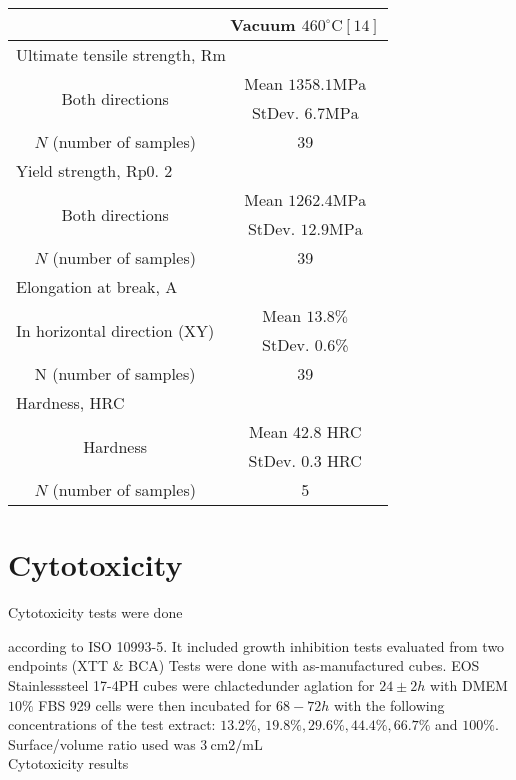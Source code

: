 \documentclass[10pt]{article}
\begin{document}
\begin{center}
\begin{tabular}{|c|c|}
\hline
 & Vacuum $460^{\circ} \mathrm{C}[14]$ \\
\hline
\multicolumn{2}{|l|}{Ultimate tensile strength, Rm} \\
\hline
\multirow[t]{2}{*}{Both directions} & Mean $1358.1 \mathrm{MPa}$ \\
\hline
 & StDev. $6.7 \mathrm{MPa}$ \\
\hline
$N$ (number of samples) & 39 \\
\hline
\multicolumn{2}{|l|}{Yield strength, Rp0. 2} \\
\hline
\multirow[t]{2}{*}{Both directions} & Mean $1262.4 \mathrm{MPa}$ \\
\hline
 & StDev. $12.9 \mathrm{MPa}$ \\
\hline
$N$ (number of samples) & 39 \\
\hline
\multicolumn{2}{|l|}{Elongation at break, A} \\
\hline
\multirow[t]{2}{*}{In horizontal direction (XY)} & Mean $13.8 \%$ \\
\hline
 & StDev. 0.6\% \\
\hline
$\mathrm{N}$ (number of samples) & 39 \\
\hline
\multicolumn{2}{|l|}{Hardness, HRC} \\
\hline
\multirow[t]{2}{*}{Hardness} & Mean 42.8 HRC \\
\hline
 & StDev. 0.3 HRC \\
\hline
$N$ (number of samples) & 5 \\
\hline
\end{tabular}
\end{center}

\section*{Cytotoxicity}
Cytotoxicity tests were done

according to ISO 10993-5. It included growth inhibition tests evaluated from two endpoints (XTT \& BCA) Tests were done with as-manufactured cubes. EOS Stainlesssteel 17-4PH cubes were chlactedunder aglation for $24 \pm 2 h$ with DMEM $10 \%$ FBS 929 cells were then incubated for $68-72 h$ with the following concentrations of the test extract: $13.2 \%$, $19.8 \%, 29.6 \%, 44.4 \%, 66.7 \%$ and $100 \%$. Surface/volume ratio used was $3 \mathrm{~cm} 2 / \mathrm{mL}$\\
Cytotoxicity results
\end{document}
